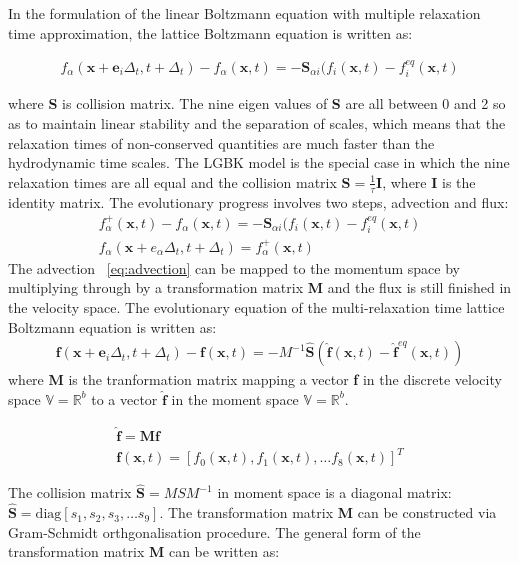 In the formulation of the linear Boltzmann equation with multiple relaxation time approximation, the lattice Boltzmann equation is written as:

\begin{align}
f_{\alpha}(\mathbf{x}+\mathbf{e}_i\Delta_t, t+ \Delta_t)-f_{\alpha}(\mathbf{x},t)=-\mathbf{S}_{\alpha i}(f_i(\mathbf{x},t)-f_i^{eq}(\mathbf{x},t)
\end{align}

\noindent where \textbf{S} is collision matrix. The nine eigen values of \textbf{S} are all between 0 and 2 so as to maintain linear stability and the separation of scales, which means that the relaxation times of non-conserved quantities are much faster than the hydrodynamic time scales. The LGBK model is the special case in which the nine relaxation times are all equal and the collision matrix $\mathbf{S}=\frac{1}{\tau}\mathbf{I}$, where \textbf{I} is the identity matrix. The evolutionary progress involves two steps, advection and flux:
\begin{gather}
f_{\alpha}^+(\mathbf{x},t)-f_{\alpha}(\mathbf{x},t) = -\mathbf{S}_{\alpha i}(f_i(\mathbf{x},t)-f_i^{eq}(\mathbf{x},t) \label{eq:advection}\\
f_{\alpha}(\mathbf{x}+e_{\alpha}\Delta_t, t+\Delta_t) = f_{\alpha}^+(\mathbf{x},t)
\end{gather}
\noindent The advection ~\cref{eq:advection} can be mapped to the momentum space by multiplying through by a transformation matrix \textbf{M} and the flux is still finished in the velocity space. The evolutionary equation of the multi-relaxation time lattice Boltzmann equation is written as:
\begin{gather}
\mathbf{f}(\mathbf{x}+\mathbf{e}_i\Delta_t, t+ \Delta_t)-\mathbf{f}(\mathbf{x},t)=-M^{-1}\hat{\mathbf{S}}(\hat{\mathbf{f}}(\mathbf{x},t)-\hat{\mathbf{f}}^{eq}(\mathbf{x},t))
\end{gather}
\noindent where \textbf{M} is the tranformation matrix mapping a vector \textbf{f} in the discrete velocity space $\mathds{V}=\mathds{R}^b$ to a vector $\hat{\mathbf{f}}$ in the moment space $\mathds{V}=\mathds{R}^b$. 

\begin{gather}
\nonumber
\hat{\mathbf{f}}= \mathbf{M}\mathbf{f} \\ 
\nonumber
\mathbf{f}(\mathbf{x},t) =\left[f_0(\mathbf{x},t),f_1(\mathbf{x},t),\dots f_8(\mathbf{x},t)\right]^T
\end{gather}

The collision matrix $\hat{\mathbf{S}} = MSM^{-1}$ in moment space is a diagonal matrix: $\hat{\mathbf{S}} =\mbox{diag} \left[ s_1, s_2, s_3,\dots s_9  \right]$. The transformation matrix \textbf{M} can be constructed via Gram-Schmidt orthgonalisation procedure. The general form of the transformation matrix \textbf{M} can be written as:

